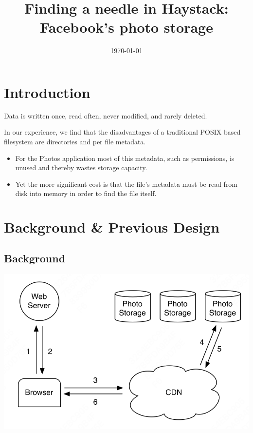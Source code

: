 \documentclass[11pt]{article}
\date{\today}
\title{Finding a needle in Haystack: Facebook's photo storage}
\begin{document}
\maketitle
\section{Introduction}
\label{sec:orgf90f9ad}
Data is written once, read often, never modified, and rarely deleted.

In our experience, we find that the disadvantages of a traditional POSIX based filesystem are
directories and per file metadata.
\begin{itemize}
\item For the Photos application most of this metadata, such as permissions, is unused and thereby wastes
storage capacity.
\item Yet the more significant cost is that the file’s metadata must be read from disk into memory in
order to find the file itself.
\end{itemize}
\section{Background \& Previous Design}
\label{sec:org761048e}
\subsection{Background}
\label{sec:org054c291}
\begin{center}
\includegraphics[width=.8\textwidth]{../../images/papers/132.png}
\end{center}
\end{document}
